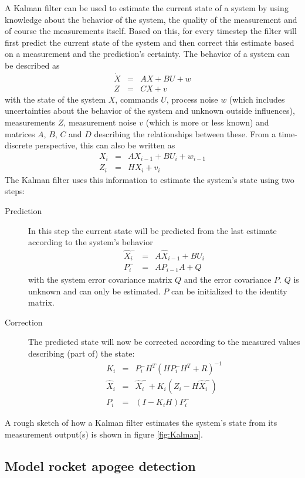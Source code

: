 \documentclass[a4paper]{article}
\begin{document}
A Kalman filter can be used to estimate the current state of a system by using knowledge about the behavior of the system, the quality of the measurement and of course the measurements itself. Based on this, for every timestep the filter will first predict the current state of the system and then correct this estimate based on a measurement and the prediction's certainty.
The behavior of a system can be described as \begin{eqnarray}\dot{X} &=& A X + B U + w \\
Z &=& C X + v\end{eqnarray} with the state of the system $X$, commands $U$, process noise $w$ (which includes uncertainties about the behavior of the system and unknown outside influences), measurements $Z$, measurement noise $v$ (which is more or less known) and matrices $A$, $B$, $C$ and $D$ describing the relationships between these. From a time-discrete perspective, this can also be written as \begin{eqnarray}X_i &=& A X_{i-1} + B U_i + w_{i-1} \\
Z_i &=& H X_i + v_i\end{eqnarray}The Kalman filter uses this information to estimate the system's state using two steps:\begin{description}
\item[Prediction]In this step the current state will be predicted from the last estimate according to the system's behavior \begin{eqnarray}\hat{X}^-_i &=& A \hat{X}_{i-1} + B U_i \\
P^-_i &=& A P_{i-1} A + Q\end{eqnarray} with the system error covariance matrix $Q$ and the error covariance $P$. $Q$ is unknown and can only be estimated. $P$ can be initialized to the identity matrix.
\item[Correction]The predicted state will now be corrected according to the measured values describing (part of) the state:\begin{eqnarray}K_i &=& P^-_i H^T(H P^-_i  H^T+R)^{-1} \\
\hat{X}_i &=& \hat{X}^-_i + K_i(Z_i - H\hat{X}^-_i) \\
P_i &=& (I - K_i H)P^-_i\end{eqnarray}
\end{description} A rough sketch of how a Kalman filter estimates the system's state from its measurement output(s) is shown in figure \ref{fig:Kalman}.

\subsection{Model rocket apogee detection}
\end{document}
